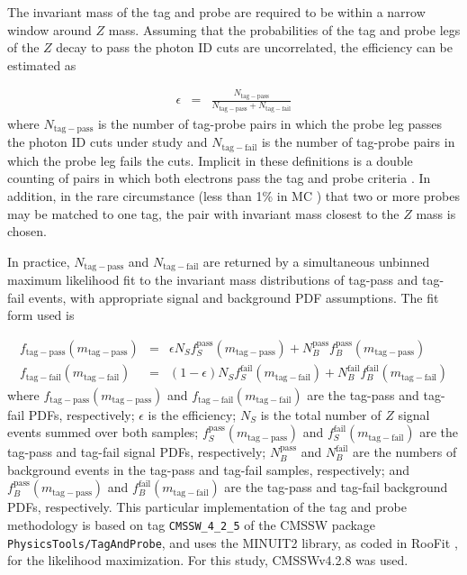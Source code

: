 \documentclass[dissertation.tex]{subfiles}
\begin{document}
The invariant mass of the tag and probe are required to be within a narrow window around $Z$ mass.  Assuming that the probabilities of the tag and probe legs of the $Z$ decay to pass the photon ID cuts are uncorrelated, the efficiency can be estimated as

\begin{eqnarray}
\epsilon &=& \frac{N_{\mathrm{tag-pass}}}{N_{\mathrm{tag-pass}} + N_{\mathrm{tag-fail}}}
\end{eqnarray}
%
where $N_{\mathrm{tag-pass}}$ is the number of tag-probe pairs in which the probe leg passes the photon ID cuts under study and $N_{\mathrm{tag-fail}}$ is the number of tag-probe pairs in which the probe leg fails the cuts.  Implicit in these definitions is a double counting of pairs in which both electrons pass the tag and probe criteria \cite{tag_and_probe_method_AN}.  In addition, in the rare circumstance (less than 1\% in MC \cite{tag_and_probe_method_AN}) that two or more probes may be matched to one tag, the pair with invariant mass closest to the $Z$ mass is chosen.

In practice, $N_{\mathrm{tag-pass}}$ and $N_{\mathrm{tag-fail}}$ are returned by a simultaneous unbinned maximum likelihood fit to the invariant mass distributions of tag-pass and tag-fail events, with appropriate signal and background PDF assumptions.  The fit form used is

\begin{eqnarray}
f_{\mathrm{tag-pass}}(m_{\mathrm{tag-pass}}) &=& \epsilon N_{S}f_{S}^{\mathrm{pass}}(m_{\mathrm{tag-pass}}) + N_{B}^{\mathrm{pass}}f_{B}^{\mathrm{pass}}(m_{\mathrm{tag-pass}})\nonumber \\
f_{\mathrm{tag-fail}}(m_{\mathrm{tag-fail}}) &=& (1 - \epsilon) N_{S}f_{S}^{\mathrm{fail}}(m_{\mathrm{tag-fail}}) + N_{B}^{\mathrm{fail}}f_{B}^{\mathrm{fail}}(m_{\mathrm{tag-fail}})
\end{eqnarray}
%
where $f_{\mathrm{tag-pass}}(m_{\mathrm{tag-pass}})$ and $f_{\mathrm{tag-fail}}(m_{\mathrm{tag-fail}})$ are the tag-pass and tag-fail PDFs, respectively; $\epsilon$ is the efficiency; $N_{S}$ is the total number of $Z$ signal events summed over both samples; $f_{S}^{\mathrm{pass}}(m_{\mathrm{tag-pass}})$ and $f_{S}^{\mathrm{fail}}(m_{\mathrm{tag-fail}})$ are the tag-pass and tag-fail signal PDFs, respectively; $N_{B}^{\mathrm{pass}}$ and $N_{B}^{\mathrm{fail}}$ are the numbers of background events in the tag-pass and tag-fail samples, respectively; and $f_{B}^{\mathrm{pass}}(m_{\mathrm{tag-pass}})$ and $f_{B}^{\mathrm{fail}}(m_{\mathrm{tag-fail}})$ are the tag-pass and tag-fail background PDFs, respectively.  This particular implementation of the tag and probe methodology is based on tag \verb+CMSSW_4_2_5+ of the CMSSW package \verb+PhysicsTools/TagAndProbe+, and uses the MINUIT2 \cite{MINUIT} library, as coded in RooFit \cite{RooFit}, for the likelihood maximization.  For this study, CMSSWv4.2.8 was used.
\end{document}
